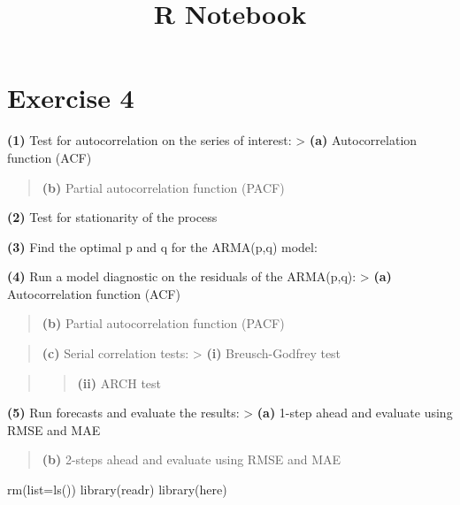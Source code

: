 \documentclass[]{article}
\title{R Notebook}
\author{}
\date{}
\newenvironment{Shaded}{\begin{snugshade}}{\end{snugshade}}
\newcommand{\AttributeTok}[1]{\textcolor[rgb]{0.77,0.63,0.00}{#1}}
\newcommand{\FunctionTok}[1]{\textcolor[rgb]{0.00,0.00,0.00}{#1}}
\newcommand{\NormalTok}[1]{#1}
\begin{document}
\maketitle

\hypertarget{exercise-4}{%
\section{Exercise 4}\label{exercise-4}}

\textbf{(1)} Test for autocorrelation on the series of interest:
\textgreater{} \textbf{(a)} Autocorrelation function (ACF)

\begin{quote}
\textbf{(b)} Partial autocorrelation function (PACF)
\end{quote}

\textbf{(2)} Test for stationarity of the process

\textbf{(3)} Find the optimal p and q for the ARMA(p,q) model:

\textbf{(4)} Run a model diagnostic on the residuals of the ARMA(p,q):
\textgreater{} \textbf{(a)} Autocorrelation function (ACF)

\begin{quote}
\textbf{(b)} Partial autocorrelation function (PACF)
\end{quote}

\begin{quote}
\textbf{(c)} Serial correlation tests: \textgreater{} \textbf{(i)}
Breusch-Godfrey test
\end{quote}

\begin{quote}
\begin{quote}
\textbf{(ii)} ARCH test
\end{quote}
\end{quote}

\textbf{(5)} Run forecasts and evaluate the results: \textgreater{}
\textbf{(a)} 1-step ahead and evaluate using RMSE and MAE

\begin{quote}
\textbf{(b)} 2-steps ahead and evaluate using RMSE and MAE
\end{quote}

\begin{Shaded}
\begin{Highlighting}[]
\FunctionTok{rm}\NormalTok{(}\AttributeTok{list=}\FunctionTok{ls}\NormalTok{())}
\FunctionTok{library}\NormalTok{(readr)}
\FunctionTok{library}\NormalTok{(here)}
\end{Highlighting}
\end{Shaded}
\end{document}
